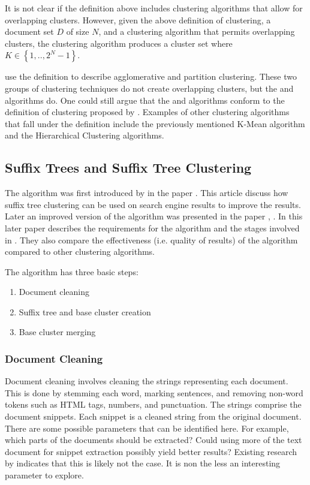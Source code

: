 It is not clear if the definition above includes clustering algorithms that allow for overlapping clusters. However, given the above definition of clustering, a document set \(D\) of size \(N\), and a clustering algorithm that permits overlapping clusters, the clustering algorithm produces a cluster set where \(K \in \left\{1, .., 2^{N}-1\right\}\).

 \citeauthor{Baeza-Yates2011a} use the definition to describe agglomerative and partition clustering. These two groups of clustering techniques do not create overlapping clusters, but the \STC and \CTC algorithms do. One could still argue that the \STC and \CTC algorithms conform to the definition of clustering proposed by \citeauthor{Baeza-Yates2011a}. Examples of other clustering algorithms that fall under the definition include the previously mentioned K-Mean algorithm and the Hierarchical Clustering algorithms.

\subsection{Suffix Trees and Suffix Tree Clustering}
The \STC algorithm was first introduced by \textcite{Oren1997} in the paper . This article discuss how suffix tree clustering can be used on search engine results to improve the results. Later an improved version of the algorithm was presented in the paper , \parencite{Oren1998}. In this later paper \citeauthor{Oren1998} describes the requirements for the \STC algorithm and the stages involved in \STC. They also compare the effectiveness (i.e. quality of results) of the algorithm compared to other clustering algorithms.

The \STC algorithm has three basic steps:
\begin{enumerate}
\item Document cleaning
\item Suffix tree and base cluster creation
\item Base cluster merging
\end{enumerate}

\subsubsection{Document Cleaning}

Document cleaning involves cleaning the strings representing each document. This is done by stemming each word, marking sentences, and removing non-word tokens such as HTML tags, numbers, and punctuation. The strings comprise the document snippets. Each snippet is a cleaned string from the original document. There are some possible parameters that can be identified here. For example, which parts of the documents should be extracted? Could using more of the text document for snippet extraction possibly yield better results? Existing research by \cite{Oren1998} indicates that this is likely not the case. It is non the less an interesting parameter to explore.

